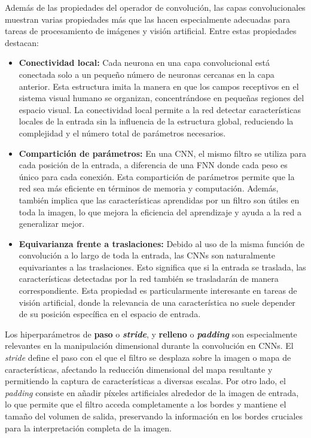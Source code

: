 Además de las propiedades del operador de convolución, las capas convolucionales
muestran varias propiedades más que las hacen especialmente adecuadas para
tareas de procesamiento de imágenes y visión artificial. Entre estas propiedades
destacan:

\begin{itemize}
	\item \textbf{Conectividad local:} Cada neurona en una capa convolucional está
	conectada solo a un pequeño número de neuronas cercanas en la capa anterior.
	Esta estructura imita la manera en que los campos receptivos en el sistema visual
	humano se organizan, concentrándose en pequeñas regiones del espacio visual.
	La conectividad local permite a la red detectar características locales de la
	entrada sin la influencia de la estructura global, reduciendo la complejidad
	y el número total de parámetros necesarios.
	
	\item \textbf{Compartición de parámetros:} En una CNN, el mismo filtro se utiliza
	para cada posición de la entrada, a diferencia de una FNN donde cada peso es
	único para cada conexión. Esta compartición de parámetros permite que la red
	sea más eficiente en términos de memoria y computación. Además, también implica
	que las características aprendidas por un filtro son útiles en toda la imagen,
	lo que mejora la eficiencia del aprendizaje y ayuda a la red a generalizar
	mejor.
	
	\item \textbf{Equivarianza frente a traslaciones:} Debido al uso de la misma
	función de convolución a lo largo de toda la entrada, las CNNs son naturalmente
	equivariantes a las traslaciones. Esto significa que si la entrada se
	traslada, las características detectadas por la red también se trasladarán de
	manera correspondiente. Esta propiedad es particularmente interesante en
	tareas de visión artificial, donde la relevancia de una característica no suele
	depender de su posición específica en el espacio de entrada.
\end{itemize}

Los hiperparámetros de \textbf{paso} o \textbf{\textit{stride}}, y \textbf{relleno}
o \textbf{\textit{padding}} son especialmente relevantes en la manipulación dimensional
durante la convolución en CNNs. El \textit{stride} define el paso con el que el filtro
se desplaza sobre la imagen o mapa de características, afectando la reducción
dimensional del mapa resultante y permitiendo la captura de características a
diversas escalas. Por otro lado, el \textit{padding} consiste en añadir píxeles artificiales
alrededor de la imagen de entrada, lo que permite que el filtro acceda
completamente a los bordes y mantiene el tamaño del volumen de salida, preservando
la información en los bordes cruciales para la interpretación completa de la imagen.

